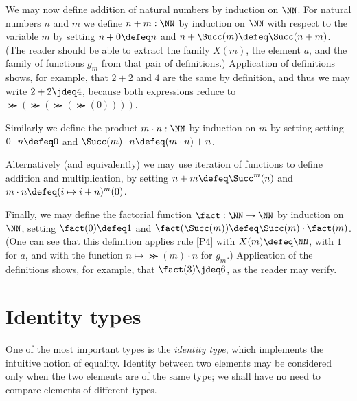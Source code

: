 We may now define addition of natural numbers by induction on $\NN$.  For natural numbers $n$ and $m$ we define $n+m : \NN$ by induction on
$\NN$ with respect to the variable $m$ by setting $n+0\defeq n$ and $n+\Succ(m)\defeq \Succ(n+m)$.  (The reader should be able to extract the
family $X(m)$, the element $a$, and the family of functions $g_m$ from that pair of definitions.)  Application of definitions shows, for
example, that $2+2$ and $4$ are the same by definition, and thus we may write $2+2 \jdeq 4$, because both expressions reduce to
$\Succ(\Succ(\Succ(\Succ(0))))$.

Similarly we define the product $m \cdot n : \NN$ by induction on $m$ by setting setting $ 0 \cdot n \defeq 0$ and
$ \Succ(m) \cdot n \defeq (m \cdot n) + n$.

Alternatively (and equivalently) we may use iteration of functions to define addition and multiplication, by setting $n+m \defeq \Succ^m(n)$ and
$m \cdot n \defeq ( i \mapsto i + n )^m (0) $.

Finally, we may define the factorial function%
$\fact : \NN \to \NN$ by induction on $\NN$, setting $\fact(0) \defeq 1$ and
$\fact(\Succ(m)) \defeq \Succ(m) \cdot \fact(m)$.  (One can see that this definition applies rule \ref{P4} with $X(m) \defeq \NN$, with $1$ for
$a$, and with the function $n \mapsto \Succ(m) \cdot n$ for $g_m$.)  Application of the definitions shows, for example, that $\fact(3) \jdeq 6$, as
the reader may verify.

\section{Identity types}
\label{sec:identity-types}

One of the most important types is the \emph{identity type}, which implements the intuitive notion of equality.
Identity between two elements may be considered only when
the two elements are of the same type; we shall have no need to compare elements of different types.


